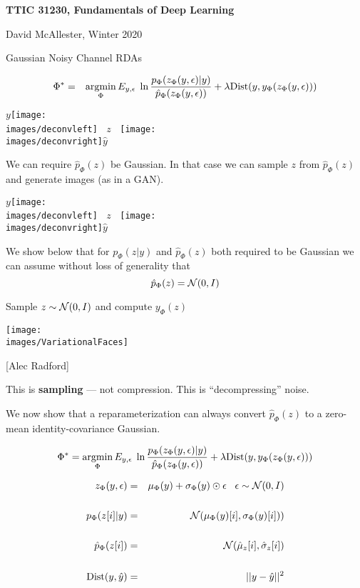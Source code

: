 





{\Huge

  \centerline{\bf TTIC 31230, Fundamentals of Deep Learning}
  \bigskip
  \centerline{David McAllester, Winter 2020}
  \vfill
  \centerline{Gaussian Noisy Channel RDAs}
  \vfill
  \vfill



{\huge
\begin{eqnarray*}
\Phi^* & = & \operatorname*{argmin}_\Phi E_{y,\epsilon}\;\ln \frac{p_\Phi(z_\Phi(y,\epsilon)|y)}{\hat{p}_\Phi(z_\Phi(y,\epsilon))}
+ \lambda \mathrm{Dist}(y,y_\Phi(z_\Phi(y,\epsilon)))
\end{eqnarray*}

\vfill
\centerline{$y$\texttt{[image: \\images/deconvleft]} $\;\;z\;\;$ \texttt{[image: \\images/deconvright]}$\hat{y}$}

\bigskip
\bigskip
We can require $\hat{p}_\Phi(z)$ be Gaussian.  In that case we can sample $z$ from $\hat{p}_\Phi(z)$ and generate images (as in a GAN).



\bigskip
\centerline{$y$\texttt{[image: \\images/deconvleft]} $\;\;z\;\;$ \texttt{[image: \\images/deconvright]}$\hat{y}$}

\bigskip
\bigskip
We show below that for $p_\Phi(z|y)$ and $\hat{p}_\Phi(z)$ both required to be Gaussian we can assume without loss
of generality that
\bigskip
$$\hat{p}_\Phi(z) = {\cal N}(0,I)$$


\centerline{Sample {\color{red} $z \sim {\cal N}(0,I)$} and compute {\color{red} $y_\Phi(z)$}}
\vfill
\centerline{\texttt{[image: \\images/VariationalFaces]}}
\centerline{[Alec Radford]}

\vfill
This is {\bf sampling} --- not compression.  This is ``decompressing'' noise.


We now show that a reparameterization can always convert $\hat{p}_\Phi(z)$ to a zero-mean identity-covariance Gaussian.

\vfill
$$\Phi^* = \operatorname*{argmin}_\Phi E_{y,\epsilon}\;\ln \frac{p_\Phi(z_\Phi(y,\epsilon)|y)}{\hat{p}_\Phi(z_\Phi(y,\epsilon))} + \lambda \mathrm{Dist}(y,y_\Phi(z_\Phi(y,\epsilon)))$$

{\color{red}
\begin{eqnarray*}
z_\Phi(y,\epsilon) & = & \mu_\Phi(y) + \sigma_\Phi(y) \odot \epsilon\;\;\;\epsilon \sim {\cal N}(0,I) \\
\\
p_\Phi(z[i]|y) & = & {\cal N}(\mu_\Phi(y)[i],\sigma_\Phi(y)[i])) \\
\\
\hat{p}_\Phi(z[i]) & = & {\cal N}(\hat{\mu}_z[i],\hat{\sigma}_z[i]) \\
\\
\mathrm{Dist}(y,\hat{y}) & = & ||y-\hat{y}||^2
\end{eqnarray*}
}

}}
